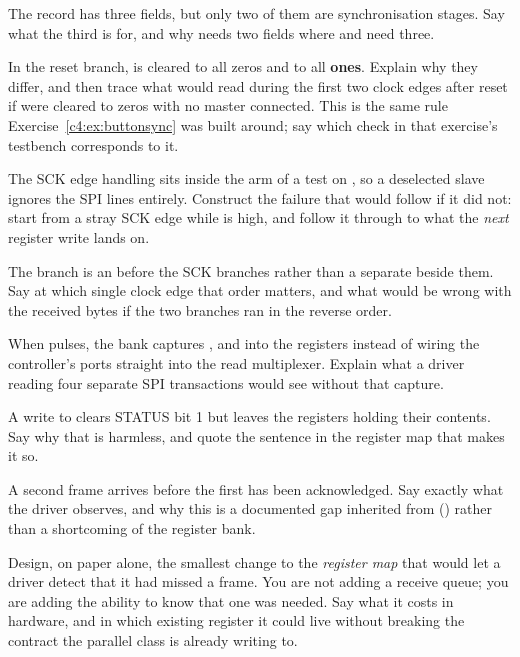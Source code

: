  The record  has three fields, but only two of them are synchronisation stages.
Say what the third is for, and why  needs two fields where  and  need
three.

 In the reset branch,  is cleared to all zeros and  to all
\textbf{ones}. Explain why they differ, and then trace what  would read during the
first two clock edges after reset if  were cleared to zeros with no master connected. This
is the same rule Exercise~\ref{c4:ex:buttonsync} was built around; say which check in that exercise's
testbench corresponds to it.

 The SCK edge handling sits inside the  arm of a test on , so a
deselected slave ignores the SPI lines entirely. Construct the failure that would follow if it did
not: start from a stray SCK edge while  is high, and follow it through to what the
\emph{next} register write lands on.

 The  branch is an  before the SCK branches rather than a
separate  beside them. Say at which single clock edge that order matters, and what would be
wrong with the received bytes if the two branches ran in the reverse order.

\label{c18:ex:capture}
 When  pulses, the bank captures ,  and
 into the  registers instead of wiring the controller's ports straight into
the read multiplexer. Explain what a driver reading four separate SPI transactions would see without
that capture.

 A write to  clears STATUS bit 1 but leaves the  registers holding
their contents. Say why that is harmless, and quote the sentence in the register map that makes it so.

 A second frame arrives before the first has been acknowledged. Say exactly what the driver
observes, and why this is a documented gap inherited from  ()
rather than a shortcoming of the register bank.

 Design, on paper alone, the smallest change to the \emph{register map} that would let a
driver detect that it had missed a frame. You are not adding a receive queue; you are adding the
ability to know that one was needed. Say what it costs in hardware, and in which existing register it
could live without breaking the contract the parallel class is already writing to.
